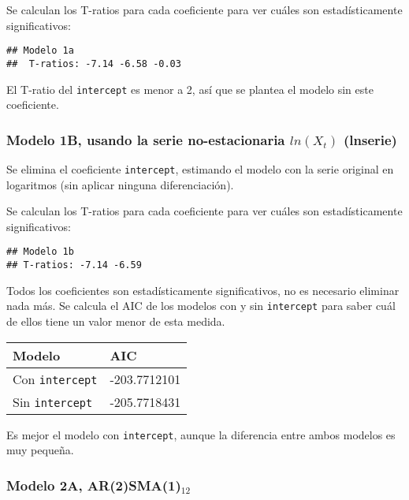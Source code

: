 \documentclass[
]{article}
\begin{document}
Se calculan los T-ratios para cada coeficiente para ver cuáles son
estadísticamente significativos:

\begin{verbatim}
## Modelo 1a 
##  T-ratios: -7.14 -6.58 -0.03
\end{verbatim}

El T-ratio del \texttt{intercept} es menor a 2, así que se plantea el
modelo sin este coeficiente.

\medskip

\hypertarget{modelo-1b-usando-la-serie-no-estacionaria-lnx_t-lnserie}{%
\subsubsection{\texorpdfstring{Modelo 1B, usando la serie
no-estacionaria \(ln(X_t)\)
(lnserie)}{Modelo 1B, usando la serie no-estacionaria ln(X\_t) (lnserie)}}\label{modelo-1b-usando-la-serie-no-estacionaria-lnx_t-lnserie}}

Se elimina el coeficiente \texttt{intercept}, estimando el modelo con la
serie original en logaritmos (sin aplicar ninguna diferenciación).

Se calculan los T-ratios para cada coeficiente para ver cuáles son
estadísticamente significativos:

\begin{verbatim}
## Modelo 1b 
## T-ratios: -7.14 -6.59
\end{verbatim}

Todos los coeficientes son estadísticamente significativos, no es
necesario eliminar nada más. Se calcula el AIC de los modelos con y sin
\texttt{intercept} para saber cuál de ellos tiene un valor menor de esta
medida.

\begin{longtable}[]{@{}ll@{}}
\toprule()
Modelo & AIC \\
\midrule()
\endhead
Con \texttt{intercept} & -203.7712101 \\
Sin \texttt{intercept} & -205.7718431 \\
\bottomrule()
\end{longtable}

Es mejor el modelo con \texttt{intercept}, aunque la diferencia entre
ambos modelos es muy pequeña.

\medskip

\hypertarget{modelo-2a-ar2sma1_12}{%
\subsubsection{\texorpdfstring{Modelo 2A,
AR(2)SMA(1)\(_{12}\)}{Modelo 2A, AR(2)SMA(1)\_\{12\}}}\label{modelo-2a-ar2sma1_12}}
\end{document}

